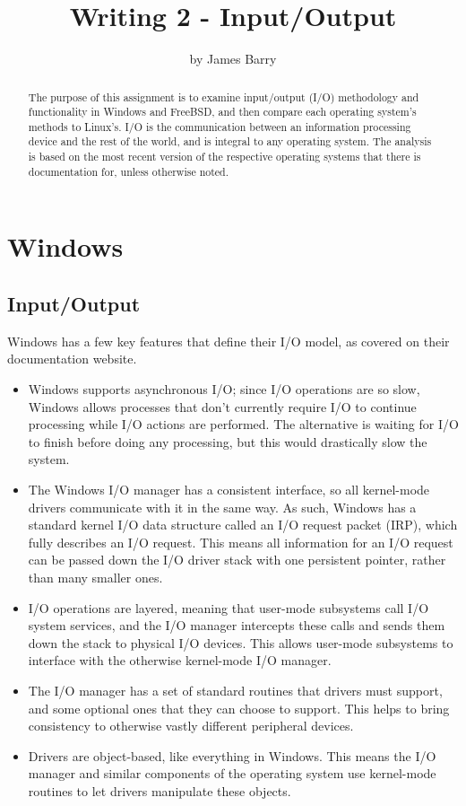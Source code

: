 \documentclass[draftclsnofoot,onecolumn,journal,letterpaper,10pt]{IEEEtran}
\title{Writing 2 - Input/Output}
\author{by James Barry}
\begin{document}
\begin{titlepage}
  \clearpage
  \maketitle
  \thispagestyle{empty}
    \begin{abstract}
      The purpose of this assignment is to examine input/output (I/O) methodology and functionality in Windows and FreeBSD, and then compare each operating system's methods to Linux's. I/O is the communication between an information processing device and the rest of the world, and is integral to any operating system. The analysis is based on the most recent version of the respective operating systems that there is documentation for, unless otherwise noted. 
    \end{abstract}
\end{titlepage}

\tableofcontents
\pagebreak

\section{Windows}

\subsection{Input/Output}

Windows has a few key features that define their I/O model, as covered on their documentation website.\cite{windowsio}
\begin{itemize}
\item Windows supports asynchronous I/O; since I/O operations are so slow, Windows allows processes that don't currently require I/O to continue processing while I/O actions are performed. The alternative is waiting for I/O to finish before doing any processing, but this would drastically slow the system.
\item The Windows I/O manager has a consistent interface, so all kernel-mode drivers communicate with it in the same way. As such, Windows has a standard kernel I/O data structure called an I/O request packet (IRP), which fully describes an I/O request. This means all information for an I/O request can be passed down the I/O driver stack with one persistent pointer, rather than many smaller ones.\cite{windowsirp}
\item I/O operations are layered, meaning that user-mode subsystems call I/O system services, and the I/O manager intercepts these calls and sends them down the stack to physical I/O devices. This allows user-mode subsystems to interface with the otherwise kernel-mode I/O manager.
\item The I/O manager has a set of standard routines that drivers must support, and some optional ones that they can choose to support. This helps to bring consistency to otherwise vastly different peripheral devices. 
\item Drivers are object-based, like everything in Windows. This means the I/O manager and similar components of the operating system use kernel-mode routines to let drivers manipulate these objects. 
\end{itemize}
\end{document}
